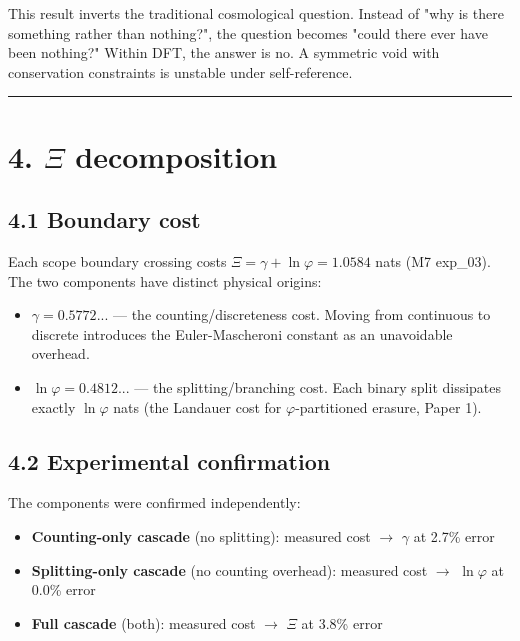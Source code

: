 \documentclass[11pt,a4paper]{article}
\providecommand{\tightlist}{\setlength{\itemsep}{0pt}\setlength{\parskip}{0pt}}
\begin{document}
This result inverts the traditional cosmological question. Instead of "why is there something rather than nothing?", the question becomes "could there ever have been nothing?" Within DFT, the answer is no. A symmetric void with conservation constraints is unstable under self-reference.

\begin{center}\rule{0.5\linewidth}{0.4pt}\end{center}

\section*{4. $\Xi$ decomposition}

\subsection*{4.1 Boundary cost}

Each scope boundary crossing costs $\Xi = \gamma + \ln\varphi = 1.0584$ nats (M7 exp\_03). The two components have distinct physical origins:

\begin{itemize}\tightlist
\item \textbf{$\gamma = 0.5772...$} — the counting/discreteness cost. Moving from continuous to discrete introduces the Euler-Mascheroni constant as an unavoidable overhead.
\item \textbf{$\ln\varphi = 0.4812...$} — the splitting/branching cost. Each binary split dissipates exactly $\ln\varphi$ nats (the Landauer cost for $\varphi$-partitioned erasure, Paper 1).
\end{itemize}

\subsection*{4.2 Experimental confirmation}

The components were confirmed independently:
\begin{itemize}\tightlist
\item \textbf{Counting-only cascade} (no splitting): measured cost $\to$ $\gamma$ at 2.7\% error
\item \textbf{Splitting-only cascade} (no counting overhead): measured cost $\to$ $\ln\varphi$ at 0.0\% error
\item \textbf{Full cascade} (both): measured cost $\to$ $\Xi$ at 3.8\% error
\end{itemize}
\end{document}

